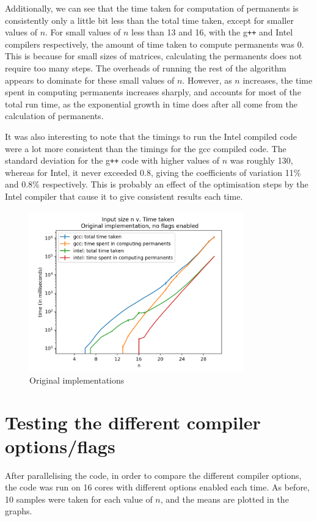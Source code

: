 \documentclass[ %
                    author={Manan Vaswani},
                supervisor={Dr. Raphael Clifford},
                    degree={MEng},
                     title={A multi-core CPU implementation of the classical Boson Sampling algorithm},
                  subtitle={},
                      type={},
                      year={2019} ]{dissertation}
\theoremstyle{plain}
\theoremstyle{definition}
\begin{document}
Additionally, we can see that the time taken for computation of permanents is consistently only a little bit less than the total time taken, except for smaller values of $n$. For small values of $n$ less than 13 and 16, with the g\texttt{++} and Intel compilers respectively, the amount of time taken to compute permanents was 0. This is because for small sizes of matrices, calculating the permanents does not require too many steps. The overheads of running the rest of the algorithm appears to dominate for these small values of $n$. However, as $n$ increases, the time spent in computing permanents increases sharply, and accounts for most of the total run time, as the exponential growth in time does after all come from the calculation of permanents.

It was also interesting to note that the timings to run the Intel compiled code were a lot more consistent than the timings for the gcc compiled code. The standard deviation for the g\texttt{++} code with higher values of $n$ was roughly 130, whereas for Intel, it never exceeded 0.8, giving the coefficients of variation 11\% and 0.8\% respectively. This is probably an effect of the optimisation steps by the Intel compiler that cause it to give consistent results each time.
\begin{figure}
	\centering
  \includegraphics[width=25em]{Graphs/org_log.png}
  \caption{Original implementations}
  \label{fig:org}
\end{figure}

\section{Testing the different compiler options/flags}
After parallelising the code, in order to compare the different compiler options, the code was run on 16 cores with different options enabled each time. As before, 10 samples were taken for each value of $n$, and the means are plotted in the graphs.
\end{document}
